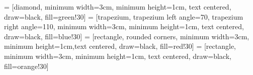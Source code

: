 \vspace{30px}

 = [diamond, minimum width=3cm, minimum height=1cm, text centered, draw=black, fill=green!30]
 = [trapezium, trapezium left angle=70, trapezium right angle=110, minimum width=3cm, minimum height=1cm, text centered, draw=black, fill=blue!30]
 = [rectangle, rounded corners, minimum width=3cm, minimum height=1cm,text centered, draw=black, fill=red!30]
 = [rectangle, minimum width=3cm, minimum height=1cm, text centered, draw=black, fill=orange!30]

